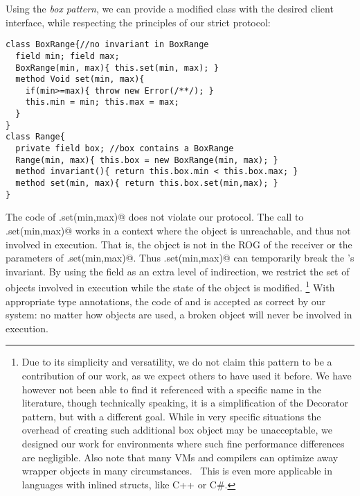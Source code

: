 Using the \emph{box pattern}, we can provide a modified
\Q@Range@ class with the desired client interface, while respecting the principles of our strict protocol:
\begin{lstlisting}
class BoxRange{//no invariant in BoxRange
  field min; field max;
  BoxRange(min, max){ this.set(min, max); }
  method Void set(min, max){
    if(min>=max){ throw new Error(/**/); }
    this.min = min; this.max = max;
  }
}
class Range{
  private field box; //box contains a BoxRange
  Range(min, max){ this.box = new BoxRange(min, max); }
  method invariant(){ return this.box.min < this.box.max; }
  method set(min, max){ return this.box.set(min,max); }
}
\end{lstlisting}
The code of \Q@Range.set(min,max)@ does not violate our protocol.
The call to
\Q@BoxRange.set(min,max)@ works in a context where the \Q@Range@ object is
unreachable, and thus not involved in execution.
That is, the \Q@Range@ object is not in the ROG of the receiver or the parameters of \Q@BoxRange.set(min,max)@.
 Thus \Q@Range.set(min,max)@ can temporarily break the \Q@Range@'s invariant.
By using the \Q@box@ field as an extra level of indirection, we restrict the set of objects involved in execution while the state of the object \Q@Range@ is modified.%
\footnote{Due to its simplicity and versatility, we do not claim this pattern to be a contribution of our work, as we expect others to have used it before. We have however not been able to find it referenced with a specific name in the literature, though technically speaking, it is a simplification of the Decorator pattern, but with a different goal.
While in very specific situations the overhead of creating such additional box object may be unacceptable, we designed our work for environments where such fine performance differences are negligible.
Also note that many VMs and compilers can optimize away wrapper objects in many circumstances.~\cite{Bolz:2011:ARP:1929501.1929508}
This is even more applicable in languages with inlined structs, like C++ or C\#.
}
With appropriate type annotations, the code of \Q@Range@ and \Q@BoxRange@ is accepted as correct by our system: no matter how \Q@Range@ objects are used, a broken \Q@Range@ object will never be involved in execution.

